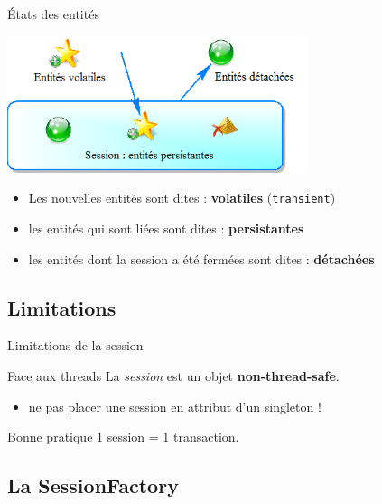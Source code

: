 \documentclass[compact]{beamer}%
\begin{document}
\begin{frame}{États des entités}
	
	\begin{center}
	\includegraphics[height=4cm]{images/entities_states.png}	
	\end{center}
	
	\pause
	\begin{itemize}[<+->]
	\item Les nouvelles entités sont dites : \textbf{volatiles} (\texttt{transient})
	\item les entités qui sont liées sont dites : \textbf{persistantes}
	\item les entités dont la session a été fermées sont dites : \textbf{détachées}
	\end{itemize}

\end{frame}


\subsection{Limitations}
\begin{frame}{Limitations de la session}
	\begin{alertblock}{Face aux threads}
	La \emph{session} est un objet \textbf{non-thread-safe}.
	\end{alertblock}

	\pause
	\begin{itemize}
		\item ne pas placer une session en attribut d'un singleton !
	\end{itemize}

	
	\pause
	\begin{block}{Bonne pratique}
	1 session = 1 transaction.
	\end{block}
	
\end{frame}



\subsection{La SessionFactory}
\end{document}
